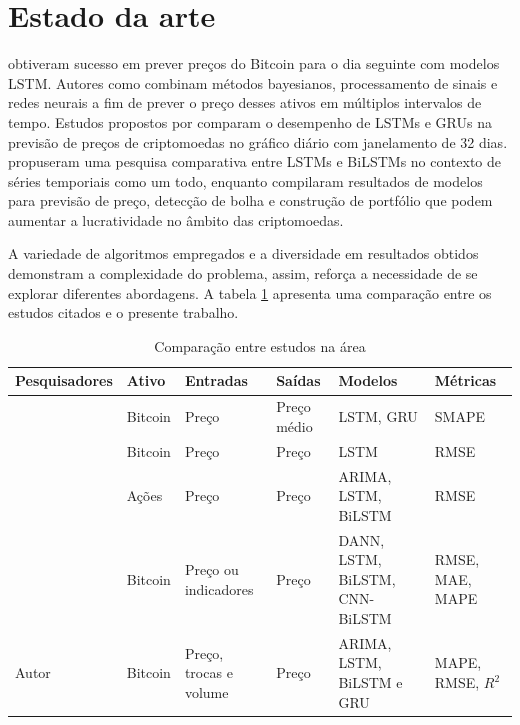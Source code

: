 
\section{Estado da arte} \label{sec:estado}

\textcite{Fer} obtiveram sucesso em prever preços do Bitcoin para o dia seguinte com modelos LSTM. Autores como \textcite{Tri} combinam métodos bayesianos, processamento de sinais e redes neurais a fim de prever o preço desses ativos em múltiplos intervalos de tempo.
Estudos propostos por \textcite{lstmvsgru} comparam o desempenho de LSTMs e GRUs na previsão de preços de criptomoedas no gráfico diário com janelamento de 32 dias.
\textcite{Siami} propuseram uma pesquisa comparativa entre LSTMs e BiLSTMs no contexto de séries temporiais como um todo, enquanto
\textcite{Zhang} compilaram resultados de modelos para previsão de preço, detecção de bolha e construção de portfólio que podem aumentar a lucratividade no âmbito das criptomoedas.

A variedade de algoritmos empregados e a diversidade em resultados obtidos demonstram a complexidade do problema, assim, reforça a necessidade de se explorar diferentes abordagens. A tabela \ref{tabela:lista_estudos} apresenta uma comparação entre os estudos citados e o presente trabalho.

\begin{table}[!htb]
  \scriptsize
  \caption{Comparação entre estudos na área} \label{tabela:lista_estudos}
  \begin{tabularx}{\textwidth}{l|X|X|X|X|X} \hline
    Pesquisadores & Ativo & Entradas & Saídas & Modelos & Métricas \\ \hline
    \cite{lstmvsgru} & Bitcoin & Preço & Preço médio & LSTM, GRU & SMAPE \\ \hline
    \cite{Fer} & Bitcoin & Preço & Preço & LSTM & RMSE \\ \hline
    \cite{Siami} & Ações & Preço & Preço& ARIMA, LSTM, BiLSTM & RMSE \\ \hline
    \cite{Tri} & Bitcoin & Preço ou indicadores& Preço & DANN, LSTM, BiLSTM, CNN-BiLSTM & RMSE, MAE, MAPE \\ \hline
    Autor & Bitcoin & Preço, trocas e volume & Preço & ARIMA, LSTM, BiLSTM e GRU & MAPE, RMSE, $R^2$ \\ \hline
  \end{tabularx}
\end{table}
